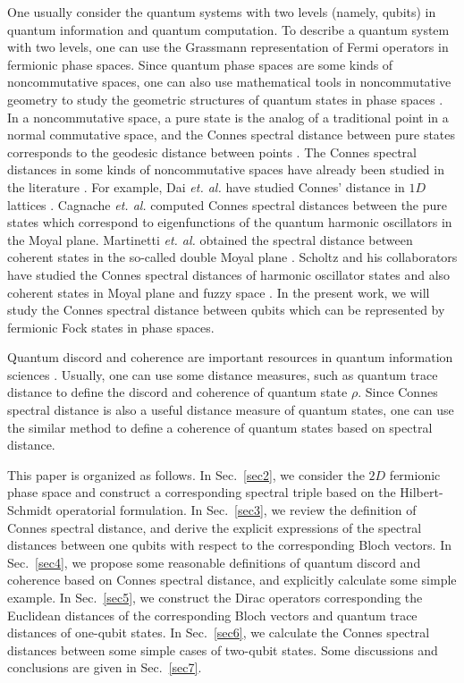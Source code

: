 \documentclass[a4paper,12pt]{article}
\begin{document}
One usually consider the quantum systems with two levels (namely, qubits) in quantum information and quantum computation. To describe a quantum system with two levels, one can use the Grassmann representation of Fermi operators in fermionic phase spaces.
Since quantum phase spaces are some kinds of noncommutative spaces, one can also use mathematical tools in noncommutative geometry to study the geometric structures of quantum states in phase spaces \cite{Connes}.
In a noncommutative space, a pure state is the analog of a traditional
point in a normal commutative space, and the Connes spectral distance between
pure states corresponds to the geodesic distance between points \cite{Connes1}.
The Connes spectral distances in some kinds of noncommutative spaces have already been studied in the literature
\cite{Bimonte,Dai,Cagnache,Wallet,Martinetti1,Martinetti,DAndrea,Pythagoras,Pythagoras1,Franco,Scholtz,Chaoba,
	Revisiting,Kumar,Chakraborty,Clare,Barrett,Lin1}.
For example, Dai \emph{et. al.} have studied Connes' distance in $1D$ lattices \cite{Dai}.
Cagnache \emph{et. al.} computed Connes spectral distances between the pure states which correspond to eigenfunctions of the quantum harmonic oscillators in the Moyal plane\cite{Cagnache}.
Martinetti \emph{et. al.} obtained the spectral distance between coherent states in the so-called double Moyal plane \cite{Martinetti}.
Scholtz and his collaborators have studied the Connes spectral distances of harmonic oscillator states and also coherent states in Moyal plane and fuzzy space \cite{Scholtz,Chaoba,Revisiting}.
In the present work, we will study the Connes spectral distance between qubits which can be represented by fermionic Fock states in phase spaces.



Quantum discord and coherence are important resources in quantum information sciences \cite{Paula,Ciccarello,Baumgratz,Shao}.
Usually, one can use some distance measures, such as quantum trace distance to define the discord and coherence of quantum state $\rho$. 
Since Connes spectral distance is also a useful distance measure of quantum states, one can use the similar method to define a coherence of quantum states based on spectral distance.


This paper is organized as follows. In Sec.~\ref{sec2}, we consider the $2D$ fermionic phase space and construct a corresponding spectral triple based on the Hilbert-Schmidt operatorial formulation.
In Sec.~\ref{sec3}, we review the definition of Connes spectral distance, and derive the explicit expressions of the spectral distances between one qubits with respect to the corresponding Bloch vectors.
In Sec.~\ref{sec4}, we propose some reasonable definitions of quantum discord and coherence based on Connes spectral distance, and explicitly calculate some simple example.
In Sec.~\ref{sec5}, we construct the Dirac operators corresponding the Euclidean distances of the corresponding Bloch vectors and quantum trace distances of one-qubit states.
In Sec.~\ref{sec6}, we calculate the Connes spectral distances between some simple cases of two-qubit states.
Some discussions and conclusions are given in Sec.~\ref{sec7}.
\end{document}
